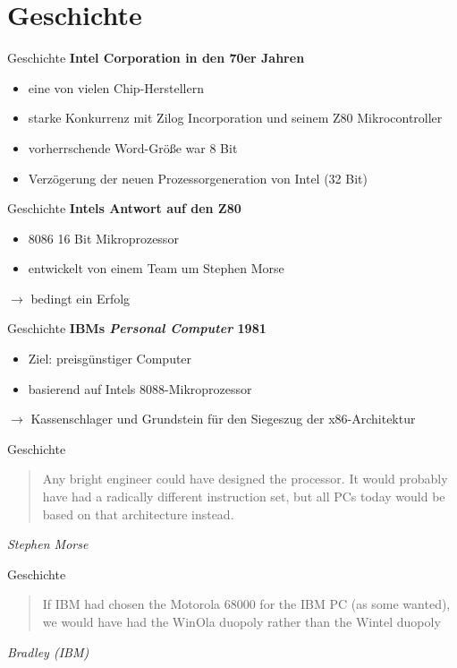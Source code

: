\section{Geschichte}

\begin{frame}{Geschichte}
	\textbf{Intel Corporation in den 70er Jahren}
	\begin{itemize}
		\item eine von vielen Chip-Herstellern
		\item starke Konkurrenz mit Zilog Incorporation und seinem Z80 Mikrocontroller
		\item vorherrschende Word-Größe war 8 Bit
		\item Verzögerung der neuen Prozessorgeneration von Intel (32 Bit)
	\end{itemize}
\end{frame}

\begin{frame}{Geschichte}
	\textbf{Intels Antwort auf den Z80}
	\begin{itemize}
		\item 8086 16 Bit Mikroprozessor
	 	\item entwickelt von einem Team um Stephen Morse 
	\end{itemize}

	$\rightarrow$ bedingt ein Erfolg
\end{frame}

\begin{frame}{Geschichte}
	\textbf{IBMs \textit{Personal Computer}	1981}
	\begin{itemize}
		\item Ziel: preisgünstiger Computer
		\item basierend auf Intels 8088-Mikroprozessor
	\end{itemize}

	$\rightarrow$ Kassenschlager und Grundstein für den Siegeszug der x86-Architektur 
\end{frame}

\begin{frame}{Geschichte}
	\begin{quote}
	Any bright engineer could have designed the processor. It would probably have had a radically different instruction set, but all PCs today would be based on that architecture instead.
	\end{quote}

	\textit{Stephen Morse}
\end{frame}

\begin{frame}{Geschichte}
	\begin{quote}
	If IBM had chosen the Motorola 68000 for the IBM PC (as some wanted), we would have had the WinOla duopoly rather than the Wintel duopoly
	\end{quote}
	\textit{Bradley (IBM)}
\end{frame}
